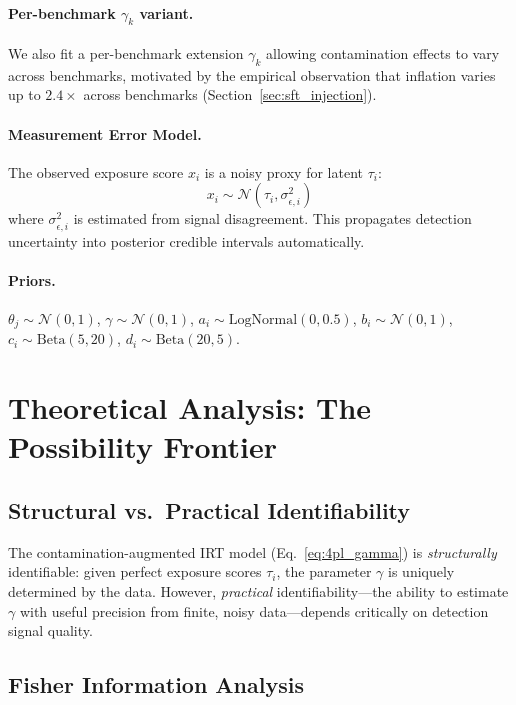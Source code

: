 \documentclass[letterpaper,11pt]{article}
\begin{document}
\paragraph{Per-benchmark $\gamma_k$ variant.}
We also fit a per-benchmark extension $\gamma_k$ allowing contamination effects to vary across benchmarks, motivated by the empirical observation that inflation varies up to $2.4\times$ across benchmarks (Section~\ref{sec:sft_injection}).

\paragraph{Measurement Error Model.}
The observed exposure score $x_i$ is a noisy proxy for latent $\tau_i$:
\begin{equation}
x_i \sim \mathcal{N}(\tau_i, \sigma^2_{\epsilon,i})
\end{equation}
where $\sigma^2_{\epsilon,i}$ is estimated from signal disagreement.
This propagates detection uncertainty into posterior credible intervals automatically.

\paragraph{Priors.}
$\theta_j \sim \mathcal{N}(0,1)$, $\gamma \sim \mathcal{N}(0,1)$, $a_i \sim \text{LogNormal}(0,0.5)$, $b_i \sim \mathcal{N}(0,1)$, $c_i \sim \text{Beta}(5,20)$, $d_i \sim \text{Beta}(20,5)$.

\section{Theoretical Analysis: The Possibility Frontier}
\label{sec:theory}

\subsection{Structural vs.\ Practical Identifiability}

The contamination-augmented IRT model (Eq.~\ref{eq:4pl_gamma}) is \emph{structurally} identifiable: given perfect exposure scores $\tau_i$, the parameter $\gamma$ is uniquely determined by the data.
However, \emph{practical} identifiability---the ability to estimate $\gamma$ with useful precision from finite, noisy data---depends critically on detection signal quality.

\subsection{Fisher Information Analysis}
\end{document}
